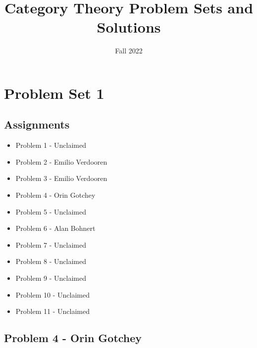 \documentclass{article}
\title{Category Theory Problem Sets and Solutions}
\author{Fall 2022}
\begin{document}
\maketitle
\tableofcontents
\newpage
\section{Problem Set 1}
\subsection{Assignments}
\begin{itemize}
    \item Problem 1 - Unclaimed
    \item Problem 2 - Emilio Verdooren
    \item Problem 3 - Emilio Verdooren
    \item Problem 4 - Orin Gotchey
    \item Problem 5 - Unclaimed
    \item Problem 6 - Alan Bohnert
    \item Problem 7 - Unclaimed
    \item Problem 8 - Unclaimed
    \item Problem 9 - Unclaimed
    \item Problem 10 - Unclaimed
    \item Problem 11 - Unclaimed
\end{itemize}

\subsection{Problem 4 - Orin Gotchey}
\end{document}
